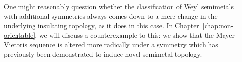 One might reasonably question whether the classification of Weyl semimetals with additional symmetries always comes down to a mere change in the underlying insulating topology, as it does in this case. In Chapter~\ref{chap:non-orientable}, we will discuss a counterexample to this: we show that the Mayer--Vietoris sequence is altered more radically under a symmetry which has previously been demonstrated to induce novel semimetal topology.
